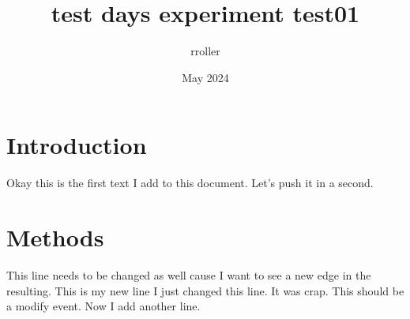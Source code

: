 \documentclass{article}
\title{test days experiment test01}
\author{rroller }
\date{May 2024}
\begin{document}
\maketitle

\section{Introduction}
Okay this is the first text I add to this document. Let's push it in a second.


\section{Methods}
This line needs to be changed as well cause I want to see a new edge in the resulting.
This is my new line
I just changed this line. It was crap. This should be a modify event.
Now I add another line.
\end{document}
